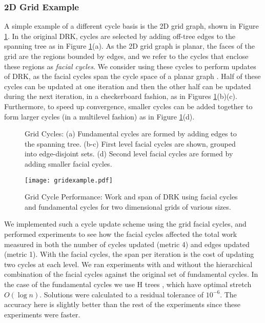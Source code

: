 \documentclass{sig-alternate}
\begin{document}
\subsubsection{2D Grid Example}
A simple example of a different cycle basis is the
2D grid graph, shown in Figure \ref{grid}.
In the original DRK, cycles are selected by adding
off-tree edges to the spanning tree as in Figure \ref{grid}(a).
As the 2D grid graph is planar, the faces of
the grid are the regions bounded by edges, and we refer
to the cycles that enclose these regions as \textit{facial cycles}.
We consider using these cycles to perform updates of DRK, as
the facial cycles span the
cycle space of a planar graph \cite{Diestel2010}.
Half of these cycles
can be updated at one iteration and then the other half can be updated
during the next iteration, in a checkerboard fashion, as in
Figures \ref{grid}(b)(c). Furthermore, to speed up convergence, smaller cycles
can be added together to form larger cycles (in a multilevel fashion)
as in Figure \ref{grid}(d).
\begin{figure}[htb]
\centering
\begin{minipage}{.22\textwidth}
\end{minipage}
\begin{minipage}{.22\textwidth}
\end{minipage}
\begin{minipage}{.22\textwidth}
\end{minipage}
\begin{minipage}{.22\textwidth}
\end{minipage}
\caption{Grid Cycles: (a) Fundamental cycles are formed by adding edges to the spanning
tree. (b-c) First level facial cycles are shown, grouped into edge-disjoint sets. (d)
Second level facial cycles are formed by adding smaller facial cycles.}
\label{grid}
\end{figure}

\begin{figure}[htb!]
\centering
\texttt{[image: gridexample.pdf]}
\caption{Grid Cycle Performance:
Work and span of DRK using facial cycles and fundamental cycles
for two dimensional grids of various sizes.}
\label{plot:gridresults}
\end{figure}

We implemented such a cycle update scheme using the grid
facial cycles, and performed experiments to see how the facial cycles affected
the total work measured in both the number of cycles updated (metric 4)
and edges updated (metric 1).
With the facial cycles,
the span per iteration is the cost of updating two cycles at each level.
We ran experiments with
and without the hierarchical combination of the facial cycles against the original
set of fundamental cycles.
In the case of the fundamental cycles we use H trees \cite{AKPW1995}, which
have optimal stretch $O(\log{n})$.
Solutions were calculated to a residual tolerance of $10^{-6}$.
The accuracy here is slightly better than the rest of the experiments
since these experiments were faster.
\end{document}
